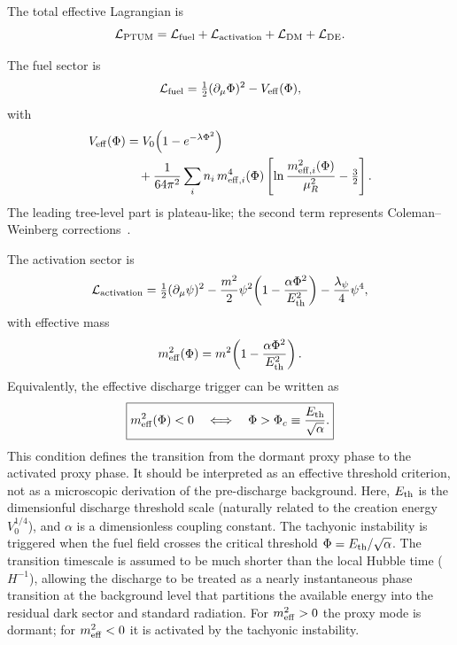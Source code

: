 \documentclass[epj]{svjour}
\begin{document}
The total effective Lagrangian is
\begin{equation}
\mathcal{L}_{\rm PTUM}
=\mathcal{L}_{\rm fuel}
+\mathcal{L}_{\rm activation}
+\mathcal{L}_{\rm DM}
+\mathcal{L}_{\rm DE}.
\end{equation}

The fuel sector is
\begin{equation}
\mathcal{L}_{\rm fuel}
=\tfrac{1}{2}(\partial_\mu\Phi)^2
-V_{\rm eff}(\Phi),
\end{equation}
with
\begin{equation}
\begin{split}
V_{\rm eff}(\Phi)
&=V_0\!\left(1-e^{-\lambda\Phi^2}\right) \\
&\quad +\frac{1}{64\pi^2}
\sum_i n_i\,m_{{\rm eff},i}^4(\Phi)
\left[\ln\frac{m_{{\rm eff},i}^2(\Phi)}{\mu_R^2}
-\tfrac{3}{2}\right].
\end{split}
\label{eq:veff}
\end{equation}
The leading tree-level part is plateau-like; the second term
represents Coleman--Weinberg corrections~\cite{ColemanWeinberg}.

The activation sector is
\begin{equation}
\mathcal{L}_{\rm activation}
=\tfrac{1}{2}(\partial_\mu\psi)^2
-\frac{m^2}{2}\psi^2\!\left(1-\frac{\alpha\Phi^2}{E_{\rm th}^2}\right)
-\frac{\lambda_\psi}{4}\psi^4,
\label{eq:lact}
\end{equation}
with effective mass
\begin{equation}
m_{\rm eff}^2(\Phi)
=m^2\!\left(1-\frac{\alpha\Phi^2}{E_{\rm th}^2}\right).
\end{equation}
Equivalently, the effective discharge trigger can be written as
\begin{equation}
\boxed{
 m_{\rm eff}^2(\Phi)<0
 \quad\Longleftrightarrow\quad
 \Phi>\Phi_c\equiv \frac{E_{\rm th}}{\sqrt{\alpha}} .
}
\label{eq:ptum_threshold_box}
\end{equation}
This condition defines the transition from the dormant proxy phase to the
activated proxy phase. It should be interpreted as an effective threshold
criterion, not as a microscopic derivation of the pre-discharge background.
Here, $E_{\rm th}$ is the dimensionful discharge threshold scale (naturally related to the creation energy $V_0^{1/4}$), and $\alpha$ is a dimensionless coupling constant. The tachyonic instability is triggered when the fuel field crosses the critical threshold $\Phi = E_{\rm th}/\sqrt{\alpha}$. The transition timescale is assumed to be much shorter than the local Hubble time ($H^{-1}$), allowing the discharge to be treated as a nearly instantaneous phase transition at the background level that partitions the available energy into the residual dark sector and standard radiation. For \(m_{\rm eff}^2>0\) the proxy mode is dormant; for \(m_{\rm eff}^2<0\) it is activated by the tachyonic instability.
\end{document}
